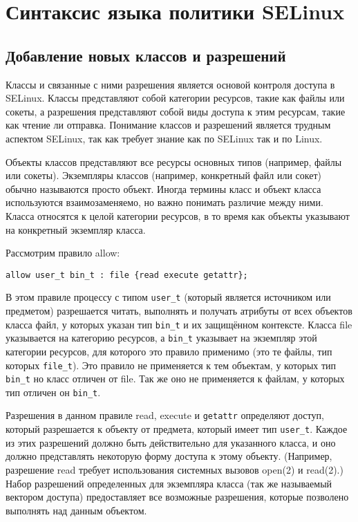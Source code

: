 \documentclass{./../class/UIR}
\begin{document}
\section{Синтаксис языка политики SELinux}
\subsection{Добавление новых классов и разрешений}
    Классы и связанные с ними разрешения является основой контроля доступа в
    SELinux. Классы представляют собой категории ресурсов, такие как файлы или
    сокеты, а разрешения представляют собой виды доступа к этим ресурсам, такие
    как чтение ли отправка. Понимание классов и разрешений является трудным
    аспектом SELinux, так как требует знание как по SELinux так и по Linux.

	Объекты классов представляют все ресурсы основных типов (например, файлы или
	сокеты). Экземпляры классов (например, конкретный файл или сокет) обычно
	называются просто объект. Иногда термины класс и объект класса используются
	взаимозаменяемо, но важно понимать различие между ними. Класса относятся к
	целой категории ресурсов, в то время как объекты указывают на конкретный
	экземпляр класса.
	
	Рассмотрим правило allow:
	\begin{verbatim}
allow user_t bin_t : file {read execute getattr};
	\end{verbatim}
	В этом правиле процессу с типом \verb"user_t" (который является источником или
	предметом) разрешается читать, выполнять и получать атрибуты от всех объектов
	класса файл, у которых указан тип \verb"bin_t" и их защищённом контексте.
	Класса file указывается на категорию ресурсов, а \verb"bin_t" указывает на экземпляр этой
	категории ресурсов, для которого это правило применимо (это те файлы, тип
	которых \verb"file_t"). Это правило не применяется к тем объектам, у которых
	тип \verb"bin_t" но класс отличен от file. Так же оно не применяется к файлам, у
	которых тип отличен он \verb"bin_t".
	
	Разрешения в данном правиле read, execute и \verb"getattr" определяют доступ,
	который разрешается к объекту от предмета, который имеет тип \verb"user_t".
	Каждое из этих разрешений должно быть действительно для указанного класса, и оно должно
	представлять некоторую форму доступа к этому объекту. (Например, разрешение
	read требует использования системных вызовов open(2) и read(2).) Набор
	разрешений определенных для экземпляра класса (так же называемый вектором
	доступа) предоставляет все возможные разрешения, которые позволено выполнять
	над данным объектом.
	
\end{document}
